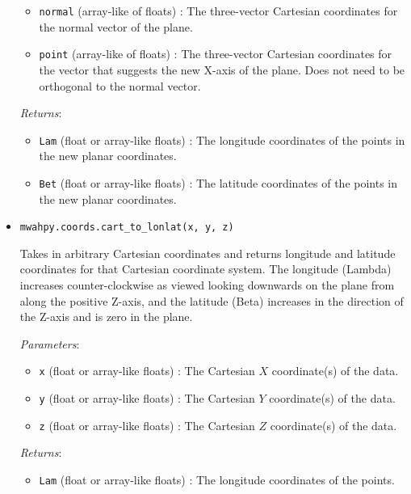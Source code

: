\documentclass{article}
\begin{document}
\begin{itemize}
\begin{itemize}
\item \verb!normal! (array-like of floats) : The three-vector Cartesian coordinates for the normal vector of the plane.

\item \verb!point! (array-like of floats) : The three-vector Cartesian coordinates for the vector that suggests the new X-axis of the plane. Does not need to be orthogonal to the normal vector.

\end{itemize}

\textit{Returns}: \begin{itemize}

\item \verb!Lam! (float or array-like floats) : The longitude coordinates of the points in the new planar coordinates.

\item \verb!Bet! (float or array-like floats) : The latitude coordinates of the points in the new planar coordinates.

\end{itemize}



\item \verb!mwahpy.coords.cart_to_lonlat(x, y, z)!

Takes in arbitrary Cartesian coordinates and returns longitude and latitude coordinates for that Cartesian coordinate system. The longitude (Lambda) increases counter-clockwise as viewed looking downwards on the plane from along the positive Z-axis, and the latitude (Beta) increases in the direction of the Z-axis and is zero in the plane.

\textit{Parameters}: \begin{itemize}

\item \verb!x! (float or array-like floats) : The Cartesian $X$ coordinate(s) of the data.

\item \verb!y! (float or array-like floats) : The Cartesian $Y$ coordinate(s) of the data.

\item \verb!z! (float or array-like floats) : The Cartesian $Z$ coordinate(s) of the data.

\end{itemize}

\textit{Returns}: \begin{itemize}

\item \verb!Lam! (float or array-like floats) : The longitude coordinates of the points.


\end{itemize}
\end{itemize}
\end{document}
